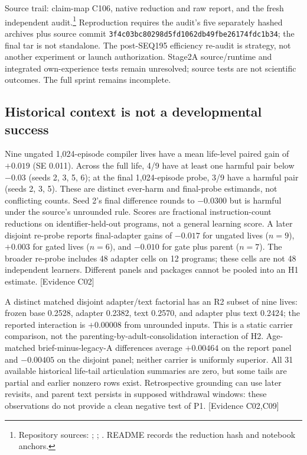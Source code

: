 \documentclass[11pt]{article}
\newcommand{\ev}[1]{\textsf{[Evidence #1]}}
\begin{document}
Source trail: claim-map C106, native reduction and raw report, and the fresh
independent audit.\footnote{Repository sources:
;
;
.
README records the reduction hash and notebook anchors.}
Reproduction requires the audit's five separately hashed archives plus source
commit \texttt{3f4c03bc80298d5fd1062db49fbe26174fdc1b34}; the final tar is
not standalone. The post-SEQ195 efficiency re-audit is strategy, not another
experiment or launch authorization. Stage2A source/runtime and integrated
own-experience tests remain unresolved; source tests are not scientific
outcomes. The full sprint remains incomplete.

\subsection{Historical context is not a developmental success}
Nine ungated 1,024-episode compiler lives have a mean life-level paired gain of
$+0.019$ (SE 0.011). Across the full life, 4/9 have at least one harmful pair
below $-0.03$ (seeds 2, 3, 5, 6); at the final 1,024-episode probe, 3/9 have a
harmful pair (seeds 2, 3, 5). These are distinct ever-harm and final-probe
estimands, not conflicting counts. Seed 2's final difference rounds to $-0.0300$
but is harmful under the source's unrounded rule. Scores are fractional
instruction-count reductions on identifier-held-out programs, not a general
learning score. A later disjoint re-probe reports final-adapter gains of $-0.017$
for ungated lives ($n=9$), $+0.003$ for gated lives ($n=6$), and $-0.010$ for gate
plus parent ($n=7$). The broader re-probe includes 48 adapter cells on 12 programs;
these cells are not 48 independent learners. Different panels and packages cannot
be pooled into an H1 estimate. \ev{C02}

A distinct matched disjoint adapter/text factorial has an R2 subset of nine
lives: frozen base 0.2528, adapter 0.2382, text 0.2570, and adapter plus text 0.2424;
the reported interaction is $+0.00008$ from unrounded inputs. This is a static
carrier comparison, not the parenting-by-adult-consolidation interaction of H2.
Age-matched brief-minus-legacy-A differences average $+0.00464$ on the report
panel and $-0.00405$ on the disjoint panel; neither carrier is uniformly superior.
All 31 available historical life-tail articulation summaries are zero, but some
tails are partial and earlier nonzero rows exist. Retrospective grounding can
use later revisits, and parent text persists in supposed withdrawal windows:
these observations do not provide a clean negative test of P1. \ev{C02,C09}
\end{document}
